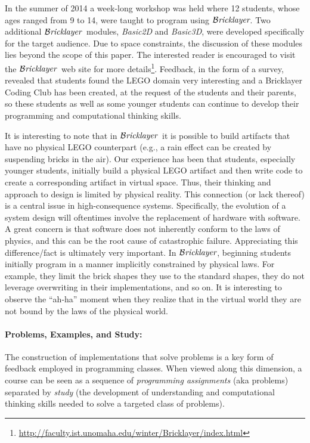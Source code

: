 \documentclass[submission,copyright,creativecommons]{eptcs}
\newcommand{\bricklayer}{\ensuremath{\mathcal{B}\emph{ricklayer}}}
\begin{document}
In the summer of 2014 a week-long workshop was held where 12 students, whose ages ranged from 9 to 14, were taught to program using \bricklayer\cite{2014:winter:techademy}. Two additional \bricklayer\ modules, \emph{Basic2D} and \emph{Basic3D}, were developed specifically for the target audience. Due to space constraints, the discussion of these modules lies beyond the scope of this paper. The interested reader is encouraged to visit the \bricklayer\ web site for more details\footnote{\url{http://faculty.ist.unomaha.edu/winter/Bricklayer/index.html}}. Feedback, in the form of a survey, revealed that students found the LEGO domain very interesting and a Bricklayer Coding Club has been created, at the request of the students and their parents, so these students as well as some younger students can continue to develop their programming and computational thinking skills.

It is interesting to note that in \bricklayer\ it is possible to build artifacts that have no physical LEGO counterpart (e.g., a rain effect can be created by suspending bricks in the air).  Our experience has been that students, especially younger students, initially build a physical LEGO artifact and then write code to create a corresponding artifact in virtual space. Thus, their thinking and approach to design is limited by physical reality. This connection (or lack thereof) is a central issue in high-consequence systems. Specifically, the evolution of a system design will oftentimes involve the replacement of hardware with software. A great concern is that software does not inherently conform to the laws of physics, and this can be the root cause of catastrophic failure. Appreciating this difference/fact is ultimately very important. In \bricklayer, beginning students initially program in a manner implicitly constrained by physical laws. For example, they limit the brick shapes they use to the standard shapes, they do not leverage overwriting in their implementations, and so on. It is interesting to observe the ``ah-ha'' moment when they realize that in the virtual world they are not bound by the laws of the physical world.




\paragraph{Problems, Examples, and Study:} The construction of implementations that solve problems is a key form of feedback employed in programming classes. When viewed along this dimension, a course can be seen as a sequence of \emph{programming assignments} (aka problems) separated by \emph{study} (the development of understanding and computational thinking skills needed to solve a targeted class of problems).
\end{document}
